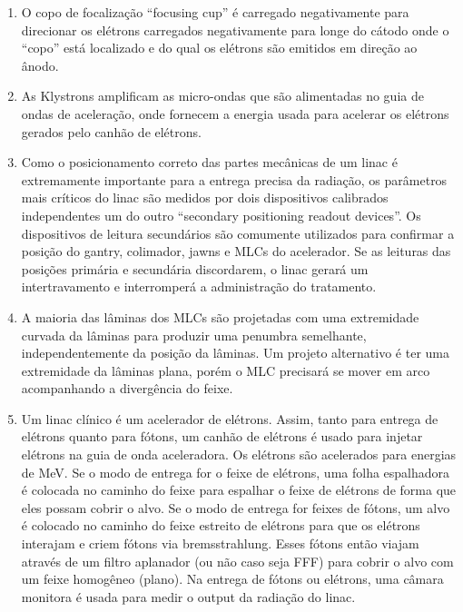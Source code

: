 \documentclass[11pt,a4paper]{article}
\begin{document}
\begin{enumerate}
        \item O copo de focalização ``focusing cup'' é carregado negativamente para direcionar os elétrons carregados negativamente para longe do cátodo onde o ``copo'' está localizado e do qual os elétrons são emitidos em direção ao ânodo.
        
        \item As Klystrons amplificam as micro-ondas que são alimentadas no guia de ondas de aceleração, onde fornecem a energia usada para acelerar os elétrons gerados pelo canhão de elétrons.
        
        \item Como o posicionamento correto das partes mecânicas de um linac é extremamente importante para a entrega precisa da radiação, os parâmetros mais críticos do linac são medidos por dois dispositivos calibrados independentes um do outro ``secondary positioning readout devices''. Os dispositivos de leitura secundários são comumente utilizados para confirmar a posição do gantry, colimador, jawns e MLCs do acelerador. Se as leituras das posições primária e secundária discordarem, o linac gerará um intertravamento e interromperá a administração do tratamento.
        
        \item A maioria das lâminas dos MLCs são projetadas com uma extremidade curvada da lâminas para produzir uma penumbra semelhante, independentemente da posição da lâminas. Um projeto alternativo é ter uma extremidade da  lâminas plana, porém o MLC precisará se mover em  arco acompanhando a divergência do feixe.
        
        \item Um linac clínico é um acelerador de elétrons. Assim, tanto para entrega de elétrons quanto para fótons, um canhão de elétrons é usado para injetar elétrons na guia de onda aceleradora. Os elétrons são acelerados para energias de MeV. Se o modo de entrega for o feixe de elétrons, uma folha espalhadora é colocada no caminho do feixe para espalhar o feixe de elétrons de forma que eles possam cobrir o alvo. Se o modo de entrega for feixes de fótons, um alvo é colocado no caminho do feixe estreito de elétrons para que os elétrons interajam e criem fótons via bremsstrahlung. Esses fótons então viajam através de um filtro aplanador (ou não caso seja FFF) para cobrir o alvo com um feixe homogêneo (plano). Na entrega de fótons ou elétrons, uma câmara monitora é usada para medir o output da radiação do linac.
        

\end{enumerate}
\end{document}
